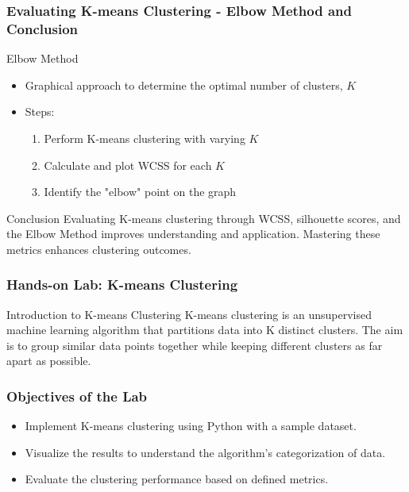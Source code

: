 \documentclass{beamer}
\begin{document}
\begin{frame}[fragile]
    \frametitle{Evaluating K-means Clustering - Elbow Method and Conclusion}
    \begin{block}{Elbow Method}
        \begin{itemize}
            \item Graphical approach to determine the optimal number of clusters, \( K \)
            \item Steps:
            \begin{enumerate}
                \item Perform K-means clustering with varying \( K \)
                \item Calculate and plot WCSS for each \( K \)
                \item Identify the "elbow" point on the graph
            \end{enumerate}
        \end{itemize}
    \end{block}

    \begin{block}{Conclusion}
        Evaluating K-means clustering through WCSS, silhouette scores, and the Elbow Method improves understanding and application. Mastering these metrics enhances clustering outcomes.
    \end{block}
\end{frame}

\begin{frame}[fragile]
    \frametitle{Hands-on Lab: K-means Clustering}
    \begin{block}{Introduction to K-means Clustering}
        K-means clustering is an unsupervised machine learning algorithm that partitions data into K distinct clusters.
        The aim is to group similar data points together while keeping different clusters as far apart as possible.
    \end{block}
\end{frame}

\begin{frame}[fragile]
    \frametitle{Objectives of the Lab}
    \begin{itemize}
        \item Implement K-means clustering using Python with a sample dataset.
        \item Visualize the results to understand the algorithm's categorization of data.
        \item Evaluate the clustering performance based on defined metrics.
    \end{itemize}
\end{frame}
\end{document}
